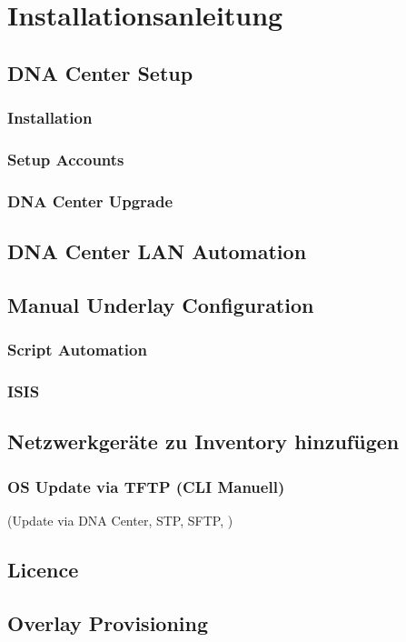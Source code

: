 \section{Installationsanleitung}

\subsection{DNA Center Setup}


\subsubsection{Installation}

\subsubsection{Setup Accounts}

\subsubsection{DNA Center Upgrade}

\subsection{DNA Center LAN Automation}

\subsection{Manual Underlay Configuration}

\subsubsection{Script Automation}

\subsubsection{ISIS}

\subsection{Netzwerkgeräte zu Inventory hinzufügen}

\subsubsection{OS Update via TFTP (CLI Manuell)}
(Update via DNA Center, STP, SFTP, )

\subsection{Licence}

\subsection{Overlay Provisioning}
